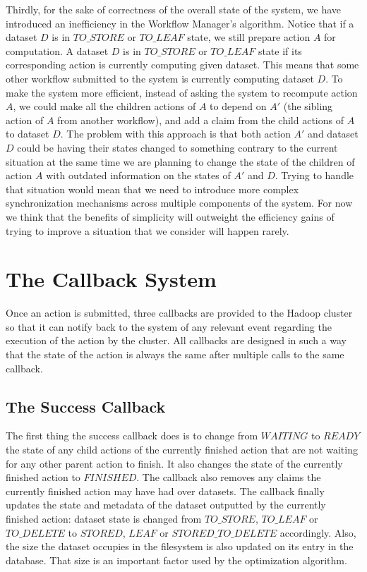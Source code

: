 Thirdly, for the sake of correctness of the overall state of the system, we have introduced an inefficiency in the Workflow Manager's algorithm. Notice that if a dataset $D$ is in $TO\_STORE$ or $TO\_LEAF$ state, we still prepare action $A$ for computation. A dataset $D$ is in $TO\_STORE$ or $TO\_LEAF$ state if its corresponding action is currently computing given dataset. This means that some other workflow submitted to the system is currently computing dataset $D$. To make the system more efficient, instead of asking the system to recompute action $A$, we could make all the children actions of $A$ to depend on $A'$ (the sibling action of $A$ from another workflow), and add a claim from the child actions of $A$ to dataset $D$. The problem with this approach is that both action $A'$ and dataset $D$ could be having their states changed to something contrary to the current situation at the same time we are planning to change the state of the children of action $A$ with outdated information on the states of $A'$ and $D$. Trying to handle that situation would mean that we need to introduce more complex synchronization mechanisms across multiple components of the system. For now we think that the benefits of simplicity will outweight the efficiency gains of trying to improve a situation that we consider will happen rarely.

\section{The Callback System}
\label{sec:callback_system}
Once an action is submitted, three callbacks are provided to the Hadoop cluster so that it can notify back to the system of any relevant event regarding the execution of the action by the cluster. All callbacks are designed in such a way that the state of the action is always the same after multiple calls to the same callback.

\subsection{The Success Callback}
The first thing the success callback does is to change from $WAITING$ to $READY$ the state of any child actions of the currently finished action that are not waiting for any other parent action to finish. It also changes the state of the currently finished action to $FINISHED$. The callback also removes any claims the currently finished action may have had over datasets. The callback finally updates the state and metadata of the dataset outputted by the currently finished action: dataset state is changed from $TO\_STORE$, $TO\_LEAF$ or $TO\_DELETE$ to $STORED$, $LEAF$ or $STORED\_TO\_DELETE$ accordingly. Also, the size the dataset occupies in the filesystem is also updated on its entry in the database. That size is an important factor used by the optimization algorithm.

